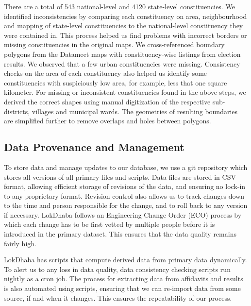 There are a total of 543 national-level and 4120 state-level constituencies. We identified inconsistencies by comparing each constituency on area, neighbourhood and mapping of state-level constituencies to the national-level constituency they were contained in. This process helped us find problems with incorrect borders or missing constituencies in the original maps. We cross-referenced boundary polygons from the Datameet maps with constituency-wise listings from election results. We observed that a few urban constituencies were missing. Consistency checks on the area of each constituency also helped us identify some constituencies with suspiciously low area, for example, less that one square kilometer. For missing or inconsistent constituencies found in the above steps, we derived the correct shapes using manual digitization of the respective sub-districts, villages and municipal wards. The geometries of resulting boundaries are simplified further to remove overlaps and holes between polygons.

\subsection{Data Provenance and Management}

To store data and manage updates to our database, we use a git repository which stores all versions of all primary files and scripts. Data files are stored in CSV format, allowing efficient storage of revisions of the data, and ensuring no lock-in to any proprietary format. Revision control also allows us to track changes down to the time and person responsible for the change, and to roll back to any version if necessary. LokDhaba follows an Engineering Change Order (ECO) process by which each change has to be first vetted by multiple people before it is introduced in the primary dataset. This ensures that the data quality remains fairly high.

LokDhaba has scripts that compute derived data from primary data dynamically. To alert us to any loss in data quality, data consistency checking scripts run nightly as a cron job. The process for extracting data from affidavits and results is also automated using scripts, ensuring that we can re-import data from some source, if and when it changes. This ensures the repeatability of our process. 
